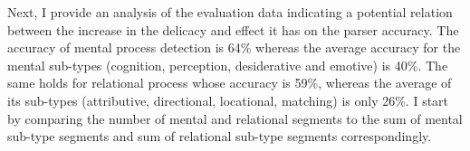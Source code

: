     Next, I provide an analysis of the evaluation data indicating a potential relation between the increase in the delicacy and effect it has on the parser accuracy. The accuracy of mental process detection is 64\% whereas the average accuracy for the mental sub-types (cognition, perception, desiderative and emotive) is 40\%. The same holds for relational process whose accuracy is 59\%, whereas the average of its sub-types (attributive, directional, locational, matching) is only 26\%. I start by comparing the number of mental and relational segments to the sum of mental sub-type segments and sum of relational sub-type segments correspondingly. 
    
   \begin{table}[!ht]
    \noindent
    \end{table}
    
